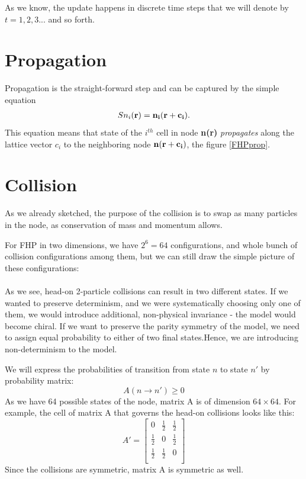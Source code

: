 As we know, the update happens in discrete time steps that we will denote by $t=1,2,3...$ and so forth.

\section{Propagation}
Propagation is the straight-forward step and can be captured by the simple equation
\begin{align*}
S n_i(\bf{r}) = n_i(\bf{r + c_i}). 
\end{align*}
This equation means that state of the $i^{th}$ cell in node \textbf{n(r)} \textit{propagates} along the lattice vector $c_i$ to the neighboring node $\bf{n(r + c_i)}$, the figure \ref{FHPprop}.

\section{Collision}
As we already sketched, the purpose of the collision is to swap as many particles in the node, as conservation of mass and momentum allows.

For FHP in two dimensions, we have $2^6 = 64$ configurations, and whole bunch of collision configurations among them, but we can still draw the simple picture of these configurations:\\
\\
As we see, head-on 2-particle collisions can result in two different states. If we wanted to preserve determinism, and we were systematically choosing only one of them, we would introduce additional, non-physical invariance - the model would become chiral. If we want to preserve the parity symmetry of the model, we need to assign equal probability to either of two final states.Hence, we are introducing non-determinism to the model.

We will express the probabilities of transition from state $n$ to state $n'$ by probability matrix:
\begin{equation}
A(n \rightarrow n') \geq 0
\end{equation}
As we have 64 possible states of the node, matrix A is of dimension $64\times 64$.
For example, the cell of matrix A that governs the head-on collisions looks like this:
\[
 A'=
  \begin{bmatrix}
    0 & \frac{1}{2} & \frac{1}{2} \\
    \frac{1}{2} & 0 & \frac{1}{2} \\
    \frac{1}{2} & \frac{1}{2} & 0 \\
  \end{bmatrix}
\]
Since the collisions are symmetric, matrix A is symmetric as well.

